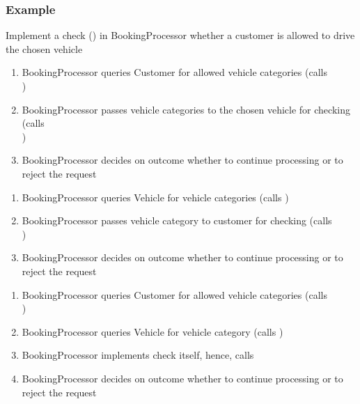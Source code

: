\subsubsection*{Example}
\begin{defBox}[title=Task]
    Implement a check () in BookingProcessor whether a customer is allowed to drive the chosen vehicle
\end{defBox}
\begin{defBox}[title=First design]
    \begin{enumerate}
        \item BookingProcessor queries Customer for allowed vehicle categories (calls \\ )
        \item BookingProcessor passes vehicle categories to the chosen vehicle for checking (calls \\)
        \item BookingProcessor decides on outcome whether to continue processing or to reject the request
    \end{enumerate}
\end{defBox}
\begin{defBox}[title=Second design]
    \begin{enumerate}
        \item BookingProcessor queries Vehicle for vehicle categories (calls )
        \item BookingProcessor passes vehicle category to customer for checking (calls \\ )
        \item BookingProcessor decides on outcome whether to continue processing or to reject the request
    \end{enumerate}
\end{defBox}
\begin{defBox}[title=Third design]
    \begin{enumerate}
        \item BookingProcessor queries Customer for allowed vehicle categories (calls \\ )
        \item BookingProcessor queries Vehicle for vehicle category (calls )
        \item BookingProcessor implements check itself, hence, calls 
        \item BookingProcessor decides on outcome whether to continue processing or to reject the request
    \end{enumerate}
\end{defBox}
